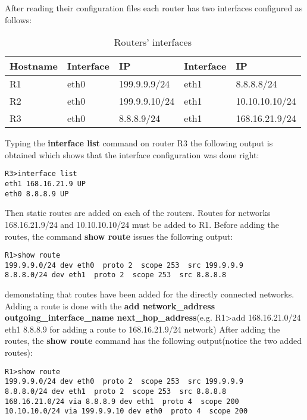{{After reading their configuration files each router has two interfaces configured as follows:
\begin{center}
  \begin{table}[htb]
  \begin{center}
  \begin{tabular}{| l | l | l | l | l |}
    \hline
      Hostname & Interface & IP & Interface & IP \\ \hline
      R1 & eth0 & 199.9.9.9/24 & eth1 & 8.8.8.8/24 \\ \hline
      R2 & eth0 & 199.9.9.10/24 & eth1 & 10.10.10.10/24\\ \hline
      R3 & eth0 & 8.8.8.9/24 & eth1 & 168.16.21.9/24 \\
    \hline
  \end{tabular}
  \end{center}
  \caption{Routers' interfaces}
  \label{table:tdevices}
  \end{table}
\end{center}
Typing the \textbf{interface list} command on router R3 the following output is obtained which shows that the interface configuration was done right:
\lstset{language=TeX, caption=Router R3 interfaces}
\begin{lstlisting}
R3>interface list  
eth1 168.16.21.9 UP
eth0 8.8.8.9 UP
\end{lstlisting}

Then static routes are added on each of the routers.
Routes for networks 168.16.21.9/24 and 10.10.10.10/24 must be added to R1.
Before adding the routes, the command \textbf{show route} issues the following output:
\lstset{language=TeX, caption=Directly connected routes}
\begin{lstlisting}
R1>show route  
199.9.9.0/24 dev eth0  proto 2  scope 253  src 199.9.9.9 
8.8.8.0/24 dev eth1  proto 2  scope 253  src 8.8.8.8 
\end{lstlisting}
demonstating that routes have been added for the directly connected networks.
Adding a route is done with the \textbf{add network_address outgoing_interface_name next_hop_address}(e.g. R1>add 168.16.21.0/24 eth1 8.8.8.9 for adding a route to 168.16.21.9/24 network)
After adding the routes, the \textbf{show route} command has the following output(notice the two added routes):
\lstset{language=TeX, caption=R1 routing table}
\begin{lstlisting}
R1>show route  
199.9.9.0/24 dev eth0  proto 2  scope 253  src 199.9.9.9 
8.8.8.0/24 dev eth1  proto 2  scope 253  src 8.8.8.8 
168.16.21.0/24 via 8.8.8.9 dev eth1  proto 4  scope 200
10.10.10.0/24 via 199.9.9.10 dev eth0  proto 4  scope 200
\end{lstlisting}

}}
